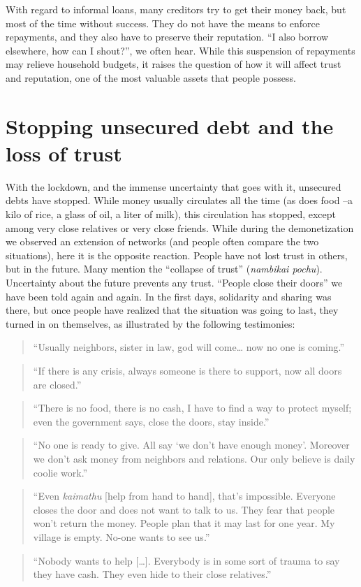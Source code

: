 \documentclass[a4paper, 11pt, onecolumn]{article}
\begin{document}
With regard to informal loans, many creditors try to get their money back, but most of the time without success.
They do not have the means to enforce repayments, and they also have to preserve their reputation. 
``I also borrow elsewhere, how can I shout?'', we often hear. 
While this suspension of repayments may relieve household budgets, it raises the question of how it will affect trust and reputation, one of the most valuable assets that people possess.

\section{Stopping unsecured debt and the loss of trust}
\label{section:trust}

With the lockdown, and the immense uncertainty that goes with it, unsecured debts have stopped. 
While money usually circulates all the time (as does food --a kilo of rice, a glass of oil, a liter of milk), this circulation has stopped, except among very close relatives or very close friends. 
While during the demonetization we observed an extension of networks (and people often compare the two situations), here it is the opposite reaction. 
People have not lost trust in others, but in the future. 
Many mention the ``collapse of trust'' (\textit{nambikai pochu}). 
Uncertainty about the future prevents any trust. 
``People close their doors'' we have been told again and again. 
In the first days, solidarity and sharing was there, but once people have realized that the situation was going to last, they turned in on themselves, as illustrated by the following testimonies:
\begin{quote} 
``Usually neighbors, sister in law, god will come… now no one is coming.''
\end{quote}
\begin{quote}
``If there is any crisis, always someone is there to support, now all doors are closed.'' 
\end{quote}
\begin{quote}
``There is no food, there is no cash, I have to find a way to protect myself; even the government says, close the doors, stay inside.'' 
\end{quote}
\begin{quote}
``No one is ready to give. 
All say ‘we don’t have enough money’. 
Moreover we don’t ask money from neighbors and relations. 
Our only believe is daily coolie work.''
\end{quote}
\begin{quote}
``Even \textit{kaimathu} [help from hand to hand], that's impossible. 
Everyone closes the door and does not want to talk to us. 
They fear that people won't return the money. 
People plan that it may last for one year. 
My village is empty. 
No-one wants to see us.''
\end{quote}
\begin{quote}
``Nobody wants to help […].
Everybody is in some sort of trauma to say they have cash. 
They even hide to their close relatives.'' 
\end{quote}
\end{document}
